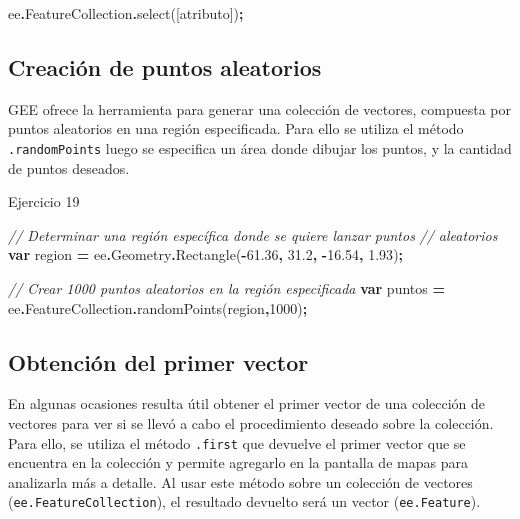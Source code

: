 \documentclass[
  12pt,
  letterpaper,
  twoside]{book}
\newenvironment{Shaded}{\begin{snugshade}}{\end{snugshade}}
\newcommand{\AttributeTok}[1]{\textcolor[rgb]{0.77,0.63,0.00}{#1}}
\newcommand{\CommentTok}[1]{\textcolor[rgb]{0.56,0.35,0.01}{\textit{#1}}}
\newcommand{\DecValTok}[1]{\textcolor[rgb]{0.00,0.00,0.81}{#1}}
\newcommand{\FloatTok}[1]{\textcolor[rgb]{0.00,0.00,0.81}{#1}}
\newcommand{\FunctionTok}[1]{\textcolor[rgb]{0.00,0.00,0.00}{#1}}
\newcommand{\KeywordTok}[1]{\textcolor[rgb]{0.13,0.29,0.53}{\textbf{#1}}}
\newcommand{\NormalTok}[1]{#1}
\newcommand{\OperatorTok}[1]{\textcolor[rgb]{0.81,0.36,0.00}{\textbf{#1}}}
\newcommand{\StringTok}[1]{\textcolor[rgb]{0.31,0.60,0.02}{#1}}
\begin{document}
\begin{Shaded}
\begin{Highlighting}[]
\NormalTok{ee}\OperatorTok{.}\AttributeTok{FeatureCollection}\OperatorTok{.}\FunctionTok{select}\NormalTok{([}\StringTok{\textquotesingle{}atributo\textquotesingle{}}\NormalTok{])}\OperatorTok{;}
\end{Highlighting}
\end{Shaded}

\hypertarget{creaciuxf3n-de-puntos-aleatorios}{%
\subsection{Creación de puntos aleatorios}\label{creaciuxf3n-de-puntos-aleatorios}}

GEE ofrece la herramienta para generar una colección de vectores, compuesta por puntos aleatorios en una región especificada. Para ello se utiliza el método \texttt{.randomPoints} luego se especifica un área donde dibujar los puntos, y la cantidad de puntos deseados.

Ejercicio 19

\begin{Shaded}
\begin{Highlighting}[]
\CommentTok{// Determinar una región específica donde se quiere lanzar puntos }
\CommentTok{// aleatorios}
\KeywordTok{var}\NormalTok{ region }\OperatorTok{=}\NormalTok{ ee}\OperatorTok{.}\AttributeTok{Geometry}\OperatorTok{.}\FunctionTok{Rectangle}\NormalTok{(}\OperatorTok{{-}}\FloatTok{61.36}\OperatorTok{,} \FloatTok{31.2}\OperatorTok{,} \OperatorTok{{-}}\FloatTok{16.54}\OperatorTok{,} \FloatTok{1.93}\NormalTok{)}\OperatorTok{;}

\CommentTok{// Crear 1000 puntos aleatorios en la región especificada}
\KeywordTok{var}\NormalTok{ puntos }\OperatorTok{=}\NormalTok{ ee}\OperatorTok{.}\AttributeTok{FeatureCollection}\OperatorTok{.}\FunctionTok{randomPoints}\NormalTok{(region}\OperatorTok{,}\DecValTok{1000}\NormalTok{)}\OperatorTok{;}
\end{Highlighting}
\end{Shaded}

\hypertarget{obtenciuxf3n-del-primer-vector}{%
\subsection{Obtención del primer vector}\label{obtenciuxf3n-del-primer-vector}}

En algunas ocasiones resulta útil obtener el primer vector de una colección de vectores para ver si se llevó a cabo el procedimiento deseado sobre la colección. Para ello, se utiliza el método \texttt{.first} que devuelve el primer vector que se encuentra en la colección y permite agregarlo en la pantalla de mapas para analizarla más a detalle. Al usar este método sobre un colección de vectores (\texttt{ee.FeatureCollection}), el resultado devuelto será un vector (\texttt{ee.Feature}).
\end{document}
